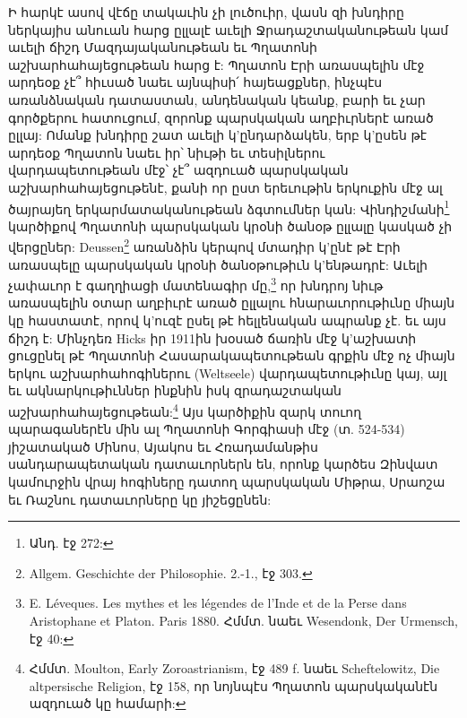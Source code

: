 \documentclass{article}
\begin{document}
{Ի հարկէ ասով վէճը տակաւին չի լուծուիր, վասն զի խնդիրը ներկայիս անուան հարց ըլլալէ աւելի Ջրադաշտականութեան կամ աւելի ճիշդ Մազդայականութեան եւ Պղատոնի աշխարհահայեցութեան հարց է: Պղատոն Էրի առասպելին մէջ արդեօք չէ՞ հիւսած նաեւ այնպիսի՛ հայեացքներ, ինչպէս առանձնական դատաստան, անդենական կեանք, բարի եւ չար գործքերու հատուցում, զորոնք պարսկական աղբիւրներէ առած ըլլայ: Ոմանք խնդիրը շատ աւելի կ'ընդարձակեն, երբ կ'ըսեն թէ արդեօք Պղատոն նաեւ իր՝ նիւթի եւ տեսիլներու վարդապետութեան մէջ՝ չէ՞ ազդուած պարսկական աշխարհահայեցութենէ, քանի որ ըստ երեւութին երկուքին մէջ ալ ծայրայեղ երկարմատականութեան ձգտումներ կան: Վինդիշմանի\footnote{Անդ. էջ 272:} կարծիքով Պղատոնի պարսկական կրօնի ծանօթ ըլլալը կասկած չի վերցըներ: Deussen\footnote{Allgem. Geschichte der Philosophie. 2.-1., էջ 303.} առանձին կերպով մտադիր կ'ընէ թէ Էրի առասպելը պարսկական կրօնի ծանօթութիւն կ'ենթադրէ: Աւելի չափաւոր է գաղղիացի մատենագիր մը,\footnote{E. Léveques. Les mythes et les légendes de l'Inde et de la Perse dans Aristophane et Platon. Paris 1880. Հմմտ. նաեւ Wesendonk, Der Urmensch, էջ 40:} որ խնդրոյ նիւթ առասպելին օտար աղբիւրէ առած ըլլալու հնարաւորութիւնը միայն կը հաստատէ, որով կ'ուզէ ըսել թէ հելլենական ապրանք չէ. եւ այս ճիշդ է: Մինչդեռ Hicks իր 1911ին խօսած ճառին մէջ կ'աշխատի ցուցընել թէ Պղատոնի Հասարակապետութեան գրքին մէջ ոչ միայն երկու աշխարհահոգիներու (Weltseele) վարդապետութիւնը կայ, այլ եւ ակնարկութիւններ ինքնին իսկ զրադաշտական աշխարհահայեցութեան:\footnote{Հմմտ. Moulton, Early Zoroastrianism, էջ 489 f. նաեւ Scheftelowitz, Die altpersische Religion, էջ 158, որ նոյնպէս Պղատոն պարսկականէն ազդուած կը համարի:} Այս կարծիքին զարկ տուող պարագաներէն մին ալ Պղատոնի Գորգիասի մէջ (տ. 524-534) յիշատակած Մինոս, Այակոս եւ Հռադամանթիս սանդարապետական դատաւորներն են, որոնք կարծես Զինվատ կամուրջին վրայ հոգիները դատող պարսկական Միթրա, Սրաոշա եւ Ռաշնու դատաւորները կը յիշեցընեն:

}
\end{document}
